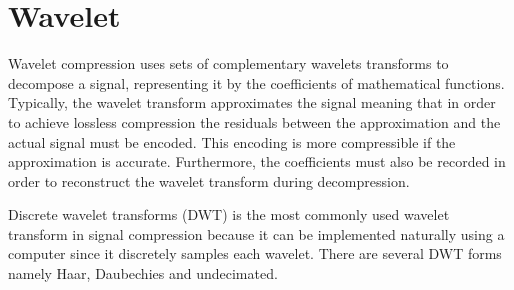 \section{Wavelet}

Wavelet compression uses sets of complementary wavelets transforms to decompose
a signal, representing it by the coefficients of mathematical functions.
Typically, the wavelet transform approximates the signal meaning that in order
to achieve lossless compression the residuals between the approximation and the
actual signal must be encoded. This encoding is more compressible if the
approximation is accurate. Furthermore, the coefficients must also be recorded
in order to reconstruct the wavelet transform during decompression.

Discrete wavelet transforms (DWT) is the most commonly used wavelet transform in
signal compression because it can be implemented naturally using a computer
since it discretely samples each wavelet. There are several DWT forms namely
Haar, Daubechies and undecimated.

